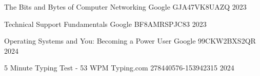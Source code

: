 

\begin{cvhonors}

  \cvhonor
    {The Bits and Bytes of Computer Networking} %
    {Google} %
    {GJA47VK8UAZQ} %
    {2023} %

  \cvhonor
    {Technical Support Fundamentals} %
    {Google} %
    {BF8AMRSPJC83} %
    {2023} %

  \cvhonor
    {Operating Systems and You: Becoming a Power User} %
    {Google} %
    {99CKW2BXS2QR} %
    {2024} %

  \cvhonor
    {5 Minute Typing Test - 53 WPM} %
    {Typing.com} %
    {278440576-153942315} %
    {2024} %

\end{cvhonors}
